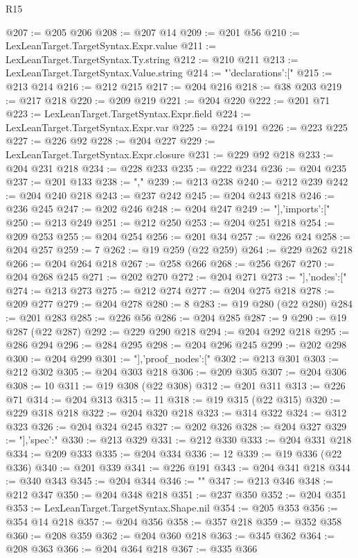 \begin{lexlean}{R15}
\begin{coremodule}
@207 := @205 @206
@208 := @207 @14
@209 := @201 @56
@210 := LexLeanTarget.TargetSyntax.Expr.value
@211 := LexLeanTarget.TargetSyntax.Ty.string
@212 := @210 @211
@213 := LexLeanTarget.TargetSyntax.Value.string
@214 := "{'declarations':["
@215 := @213 @214
@216 := @212 @215
@217 := @204 @216
@218 := @38 @203
@219 := @217 @218
@220 := @209 @219
@221 := @204 @220
@222 := @201 @71
@223 := LexLeanTarget.TargetSyntax.Expr.field
@224 := LexLeanTarget.TargetSyntax.Expr.var
@225 := @224 @191
@226 := @223 @225
@227 := @226 @92
@228 := @204 @227
@229 := LexLeanTarget.TargetSyntax.Expr.closure
@231 := @229 @92 @218
@233 := @204 @231 @218
@234 := @228 @233
@235 := @222 @234
@236 := @204 @235
@237 := @201 @133
@238 := ","
@239 := @213 @238
@240 := @212 @239
@242 := @204 @240 @218
@243 := @237 @242
@245 := @204 @243 @218
@246 := @236 @245
@247 := @202 @246
@248 := @204 @247
@249 := "],'imports':["
@250 := @213 @249
@251 := @212 @250
@253 := @204 @251 @218
@254 := @209 @253
@255 := @204 @254
@256 := @201 @34
@257 := @226 @24
@258 := @204 @257
@259 := 7
@262 := @19 @259 (@22 @259)
@264 := @229 @262 @218
@266 := @204 @264 @218
@267 := @258 @266
@268 := @256 @267
@270 := @204 @268 @245
@271 := @202 @270
@272 := @204 @271
@273 := "],'nodes':["
@274 := @213 @273
@275 := @212 @274
@277 := @204 @275 @218
@278 := @209 @277
@279 := @204 @278
@280 := 8
@283 := @19 @280 (@22 @280)
@284 := @201 @283
@285 := @226 @56
@286 := @204 @285
@287 := 9
@290 := @19 @287 (@22 @287)
@292 := @229 @290 @218
@294 := @204 @292 @218
@295 := @286 @294
@296 := @284 @295
@298 := @204 @296 @245
@299 := @202 @298
@300 := @204 @299
@301 := "],'proof_nodes':["
@302 := @213 @301
@303 := @212 @302
@305 := @204 @303 @218
@306 := @209 @305
@307 := @204 @306
@308 := 10
@311 := @19 @308 (@22 @308)
@312 := @201 @311
@313 := @226 @71
@314 := @204 @313
@315 := 11
@318 := @19 @315 (@22 @315)
@320 := @229 @318 @218
@322 := @204 @320 @218
@323 := @314 @322
@324 := @312 @323
@326 := @204 @324 @245
@327 := @202 @326
@328 := @204 @327
@329 := "],'spec':"
@330 := @213 @329
@331 := @212 @330
@333 := @204 @331 @218
@334 := @209 @333
@335 := @204 @334
@336 := 12
@339 := @19 @336 (@22 @336)
@340 := @201 @339
@341 := @226 @191
@343 := @204 @341 @218
@344 := @340 @343
@345 := @204 @344
@346 := "}"
@347 := @213 @346
@348 := @212 @347
@350 := @204 @348 @218
@351 := @237 @350
@352 := @204 @351
@353 := LexLeanTarget.TargetSyntax.Shape.nil
@354 := @205 @353
@356 := @354 @14 @218
@357 := @204 @356
@358 := @357 @218
@359 := @352 @358
@360 := @208 @359
@362 := @204 @360 @218
@363 := @345 @362
@364 := @208 @363
@366 := @204 @364 @218
@367 := @335 @366

\end{coremodule}
\end{lexlean}
